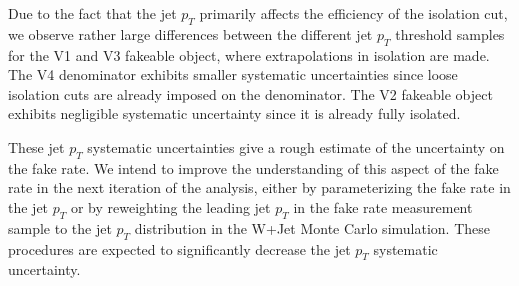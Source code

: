 Due to the fact that the jet $p_{T}$ primarily affects the efficiency of the isolation cut,
we observe rather large differences between the different jet $p_{T}$ threshold samples
for the V1 and V3 fakeable object, where extrapolations in isolation are made. The V4 
denominator exhibits smaller systematic uncertainties since loose isolation cuts are 
already imposed on the denominator. The V2 fakeable object exhibits negligible 
systematic uncertainty since it is already fully isolated. 

These jet $p_{T}$ systematic uncertainties give a rough estimate of the uncertainty on the fake rate. 
We intend to improve the understanding of this aspect of the fake rate in the next iteration of the
analysis, either by parameterizing the fake rate in the jet $p_{T}$ or by reweighting the leading 
jet $p_{T}$ in the fake rate measurement sample to the jet $p_{T}$ distribution in the W+Jet Monte Carlo
simulation. These procedures are expected to significantly decrease the jet $p_{T}$ systematic
uncertainty.
